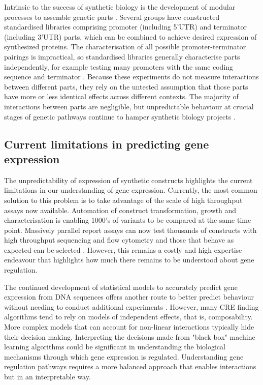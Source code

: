 \documentclass[../main.tex]{subfiles}
\begin{document}
Intrinsic to the success of synthetic biology is the development of modular processes to assemble genetic parts \parencite{Curran2013,Lee2015,Garcia2018,Andreou2018}.
Several groups have constructed standardised libraries comprising promoter (including 5’UTR) and terminator (including 3’UTR) parts, which can be combined to achieve desired expression of synthesized proteins.
The characterisation of all possible promoter-terminator pairings is impractical, so standardised libraries generally characterise parts independently, for example testing many promoters with the same coding sequence and terminator \parencite{Lee2015}.
Because these experiments do not measure interactions between different parts, they rely on the untested assumption that those parts have more or less identical effects across different contexts.
The majority of interactions between parts are negligible, but unpredictable behaviour at crucial stages of genetic pathways continue to hamper synthetic biology projects \parencite{Kittleson2012}.

\subsection{Current limitations in predicting gene expression}

The unpredictability of expression of synthetic constructs highlights the current limitations in our understanding of gene expression.
Currently, the most common solution to this problem is to take advantage of the scale of high throughput assays now available. 
Automation of construct transformation, growth and characterisation is enabling 1000's of variants to be compared at the same time point. 
Massively parallel report assays can now test thousands of constructs with high throughput sequencing and flow cytometry and those that behave as expected can be selected \parencite{Kosuri2013, Inoue2015}. 
However, this remains a costly and high expertise endeavour that highlights how much there remains to be understood about gene regulation. 

The continued development of statistical models to accurately predict gene expression from DNA sequences offers another route to better predict behaviour without needing to conduct additional experiments \parencite{Li2015}. 
However, many CRE finding algorithms tend to rely on models of independent effects, that is, composability.
More complex models that can account for non-linear interactions typically hide their decision making. 
Interpreting the decisions made from "black box" machine learning algorithms \parencite{Guidotti2018} could be significant in understanding the biological mechanisms through which gene expression is regulated. 
Understanding gene regulation pathways requires a more balanced approach that enables interactions but in an interpretable way. 
\end{document}
